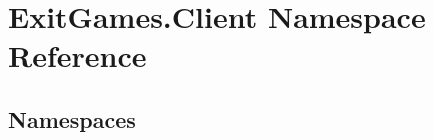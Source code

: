 \hypertarget{namespace_exit_games_1_1_client}{}\section{Exit\+Games.\+Client Namespace Reference}
\label{namespace_exit_games_1_1_client}
\subsection*{Namespaces}
\begin{DoxyCompactItemize}
\end{DoxyCompactItemize}
